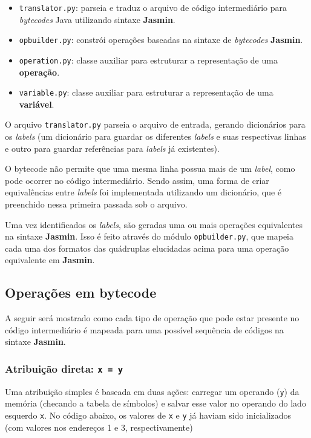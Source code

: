 \begin{itemize}
\item \texttt{translator.py}: parseia e traduz o arquivo de código intermediário para \textit{bytecodes} Java utilizando sintaxe \textbf{Jasmin}. 
\item \texttt{opbuilder.py}: constrói operações baseadas na sintaxe de \textit{bytecodes} \textbf{Jasmin}.
\item \texttt{operation.py}: classe auxiliar para estruturar a representação de uma \textbf{operação}.
\item \texttt{variable.py}: classe auxiliar para estruturar a representação de uma \textbf{variável}.
\end{itemize}

O arquivo \texttt{translator.py} parseia o arquivo de entrada, gerando dicionários para os \textit{labels} (um dicionário para guardar os diferentes \textit{labels} e suas respectivas linhas e outro para guardar referências para \textit{labels} já existentes).

O bytecode não permite que uma mesma linha possua mais de um \textit{label}, como pode ocorrer no código intermediário. Sendo assim, uma forma de criar equivalências entre \textit{labels} foi implementada utilizando um dicionário, que é preenchido nessa primeira passada sob o arquivo.

Uma vez identificados os \textit{labels}, são geradas uma ou mais operações equivalentes na sintaxe \textbf{Jasmin}. Isso é feito através do módulo \texttt{opbuilder.py}, que mapeia cada uma dos formatos das quádruplas elucidadas acima para uma operação equivalente em \textbf{Jasmin}.

\subsection{Operações em bytecode}

A seguir será mostrado como cada tipo de operação que pode estar presente no código intermediário é mapeada para uma possível sequência de códigos na sintaxe \textbf{Jasmin}.

\subsubsection{Atribuição direta: \texttt{x = y} }

Uma atribuição simples é baseada em duas ações: carregar um operando (\texttt{y}) da memória (checando a tabela de símbolos) e salvar esse valor no operando do lado esquerdo \texttt{x}. No código abaixo, os valores de \texttt{x} e \texttt{y} já haviam sido inicializados (com valores nos endereços 1 e 3, respectivamente)


